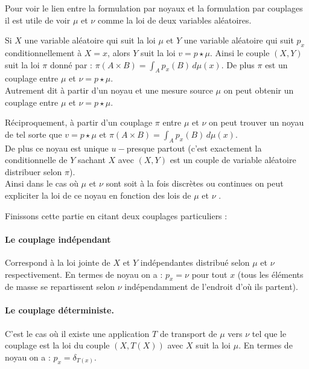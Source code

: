 \documentclass[
    8.2pt,
    a4paper,
    logo,
    twocolumn
]{template}
\begin{document}
    Pour voir le lien entre la formulation par noyaux et la formulation par couplages il est utile de voir $\mu$ et $\nu$ comme la loi de deux variables aléatoires.

    Si $X$ une variable aléatoire qui suit la loi $\mu$ et $Y$ une variable aléatoire qui suit $p_x$ conditionnellement à $X=x$, alors $Y$ suit la loi $v=p \star \mu$. Ainsi le couple $(X, Y)$ suit la loi $\pi$ donné par : $\pi (A \times B)= \int_{A} p_x(B) \,d\mu(x)$. De plus $\pi$ est un couplage entre $\mu$ et $\nu=p \star \mu$. \\
    Autrement dit à partir d’un noyau et une mesure source $\mu$ on peut obtenir un couplage entre $\mu$ et $\nu= p \star \mu$.

    Réciproquement, à partir d’un couplage $\pi$ entre $\mu$ et $\nu$ on peut trouver un noyau de tel sorte que $v= p \star \mu$ et $\pi (A\times B)= \int_{A} p_x(B) \,d\mu(x)$. \\
    De plus ce noyau est unique $u-$presque partout (c’est exactement la conditionnelle de $Y$ sachant $X$ avec $(X, Y)$ est un couple de variable aléatoire distribuer selon $\pi$). \\
    Ainsi dans le cas où $\mu$ et $\nu$ sont soit à la fois discrètes ou continues on peut expliciter la loi de ce noyau en fonction des lois de $\mu$ et $\nu$ \citep{Notes}.

    Finissons cette partie en citant deux couplages particuliers :
    \paragraph{Le couplage indépendant}
    Correspond à la loi jointe de $X$ et $Y$ indépendantes distribué selon $\mu$ et $\nu$ respectivement. En termes de noyau on a : $p_x=\nu$ pour tout $x$ (tous les éléments de masse se repartissent selon $\nu$ indépendamment de l’endroit d’où ils partent).

    \paragraph{Le couplage déterministe.} C’est le cas où il existe une application $T$ de transport de $\mu$ vers $\nu$ tel que le couplage est la loi du couple $(X, T(X))$ avec $X$ suit la loi $\mu$. En termes de noyau on a : $p_x=\delta_{T(x)}$.
\end{document}
